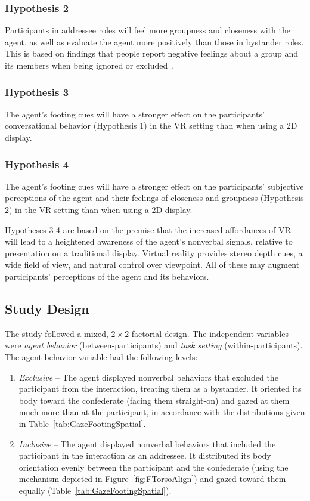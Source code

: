 \subsubsection{Hypothesis 2}

Participants in addressee roles will feel more groupness and closeness with the agent, as well as evaluate the agent more positively than those in bystander roles. This is based on findings that people report negative feelings about a group and its members when being ignored or excluded~\cite{geller1974being}.

\subsubsection{Hypothesis 3}

The agent's footing cues will have a stronger effect on the participants' conversational behavior (Hypothesis 1) in the VR setting than when using a 2D display.

\subsubsection{Hypothesis 4}

The agent's footing cues will have a stronger effect on the participants' subjective perceptions of the agent and their feelings of closeness and groupness (Hypothesis 2) in the VR setting than when using a 2D display.

Hypotheses 3-4 are based on the premise that the increased affordances of VR will lead to a heightened awareness of the agent's nonverbal signals, relative to presentation on a traditional display. Virtual reality provides stereo depth cues, a wide field of view, and natural control over viewpoint. All of these may augment participants' perceptions of the agent and its behaviors.

\subsection{Study Design}

The study followed a mixed, $2 \times 2$ factorial design. The independent variables were \emph{agent behavior} (between-participants) and \emph{task setting} (within-participants). The agent behavior variable had the following levels:

\begin{enumerate}
\item \emph{Exclusive} -- The agent displayed nonverbal behaviors that excluded the participant from the interaction, treating them as a bystander. It oriented its body toward the confederate (facing them straight-on) and gazed at them much more than at the participant, in accordance with the distributions given in Table~\ref{tab:GazeFootingSpatial}.
\item \emph{Inclusive} -- The agent displayed nonverbal behaviors that included the participant in the interaction as an addressee. It distributed its body orientation evenly between the participant and the confederate (using the mechanism depicted in Figure~\ref{fig:FTorsoAlign}) and gazed toward them equally (Table~\ref{tab:GazeFootingSpatial}).
\end{enumerate}

